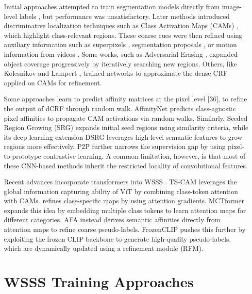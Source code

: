 Initial approaches attempted to train segmentation models directly from image-level labels \cite{dcnn}, but performance was unsatisfactory. Later methods introduced discriminative localization techniques such as Class Activation Maps (CAMs) \cite{cam}, which highlight class-relevant regions. These coarse cues were then refined using auxiliary information such as superpixels \cite{imagelevelpixel}, segmentation proposals \cite{imagelevelpixel}, or motion information from videos \cite{wsss_motion_cues}. Some works, such as Adversarial Erasing \cite{adversarial_erasing}, expanded object coverage progressively by iteratively searching new regions. Others, like Kolesnikov and Lampert \cite{kolesnikov2016}, trained networks to approximate the dense CRF \cite{krähenbühl} applied on CAMs for refinement.

Some approaches learn to predict affinity matrices at the pixel level [36], to refine the output of dCRF through random walk. AffinityNet \cite{wsss_affinitynet} predicts class-agnostic pixel affinities to propagate CAM activations via random walks. Similarly, Seeded Region Growing (SRG) \cite{srg} expands initial seed regions using similarity criteria, while its deep learning extension DSRG \cite{wsss_dsrg_deep_seeded_region_growing} leverages high-level semantic features to grow regions more effectively. P2P \cite{pixel_to_prototype} further narrows the supervision gap by using pixel-to-prototype contrastive learning. A common limitation, however, is that most of these CNN-based methods inherit the restricted locality of convolutional features.

Recent advances incorporate transformers into WSSS \cite{camtokens, getam}. TS-CAM \cite{camtokens} leverages the global information capturing ability of ViT by combining class-token attention with CAMs. \cite{getam} refines class-specific maps by using attention gradients. MCTformer \cite{wsss_MCTformer} expands this idea by embedding multiple class tokens to learn attention maps for different categories. AFA \cite{wsss_afa_affinity_from_attention} instead derives semantic affinities directly from attention maps to refine coarse pseudo-labels. FrozenCLIP \cite{wsss_frozen_clip} pushes this further by exploiting the frozen CLIP backbone to generate high-quality pseudo-labels, which are dynamically updated using a refinement module (RFM).


\section{WSSS Training Approaches}
\label{sec:stages}

